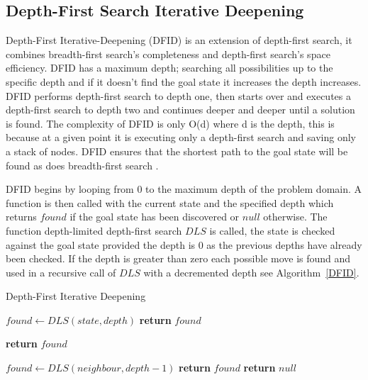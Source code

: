 \documentclass[final]{cmpreport}
\begin{document}
  
\subsection{Depth-First Search Iterative Deepening}
Depth-First Iterative-Deepening (DFID) is an extension of depth-first search, it combines breadth-first search's completeness and depth-first search's space efficiency. DFID has a maximum depth; searching all possibilities up to the specific depth and if it doesn't find the goal state it increases the depth increases. DFID performs depth-first search to depth one, then starts over and executes a depth-first search to depth two and continues deeper and deeper until a solution is found. The complexity of DFID is only O(d) where d is the depth, this is because at a given point it is executing only a depth-first search and saving only a stack of nodes. DFID ensures that the shortest path to the goal state will be found as does breadth-first search \citep{DBLP:conf/otm/MeissnerB11}.

DFID begins by looping from 0 to the maximum depth of the problem domain. A function is then called with the current state and the specified depth which returns $found$ if the goal state has been discovered or $null$ otherwise. The function depth-limited depth-first search $DLS$ is called, the state is checked against the goal state provided the depth is 0 as the previous depths have already been checked. If the depth is greater than zero each possible move is found and used in a recursive call of $DLS$ with a decremented depth see Algorithm~\ref{DFID}. 

\makeatletter
\def\BState{\State\hskip-\ALG@thistlm}
\makeatother



	\begin{algorithm}
	\caption{Depth-First Iterative Deepening}\label{DFID}
	\begin{algorithmic}[1]
		\State$ found \gets DLS(state, depth)$
		\State \textbf{return} $found$
		\EndIf
		\EndFor
		\EndProcedure
		
		\State \textbf{return} $found$
		\EndIf
		
		\State $found \gets DLS(neighbour, depth-1)$
		\State \textbf{return} $found$
		\EndIf
		\EndFor
		\EndIf 
		\State \textbf{return} $null$
		\EndProcedure
	\end{algorithmic}	
\end{algorithm}	
\end{document}
